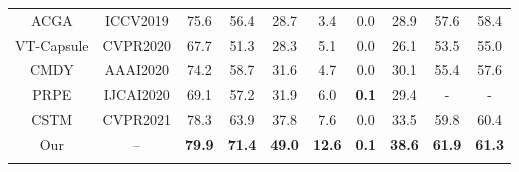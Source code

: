 \documentclass[10pt,twocolumn,letterpaper]{article}
\begin{document}
\begin{table*}[t!]
\begin{tabular}{cccc|cc|ccccc|c|cc|}
		


		
		\multicolumn{4}{|c|}{ACGA \cite{wang2019asymmetric}}                       & \multicolumn{2}{c|}{ICCV2019}                & \multicolumn{1}{|c|}{75.6} & \multicolumn{1}{c|}{56.4}  & \multicolumn{1}{c|}{28.7} & \multicolumn{1}{c|}{3.4} & \multicolumn{1}{c|}{0.0} &  \multicolumn{1}{c|}{28.9} & \multicolumn{1}{c|}{57.6} & \multicolumn{1}{c|}{58.4} \\
		
		
	    \multicolumn{4}{|c|}{VT-Capsule \cite{mcintosh2020visual}}                  & \multicolumn{2}{c|}{CVPR2020}                & \multicolumn{1}{|c|}{67.7} & \multicolumn{1}{c|}{51.3}  & \multicolumn{1}{c|}{28.3} & \multicolumn{1}{c|}{5.1} & \multicolumn{1}{c|}{0.0} & \multicolumn{1}{c|}{26.1}  & \multicolumn{1}{c|}{53.5} & \multicolumn{1}{c|}{55.0}  \\
		
		\multicolumn{4}{|c|}{CMDY \cite{wang2020context}}                        & \multicolumn{2}{c|}{AAAI2020}                & \multicolumn{1}{|c|}{74.2} & \multicolumn{1}{c|}{58.7}  & \multicolumn{1}{c|}{31.6} & \multicolumn{1}{c|}{4.7} & \multicolumn{1}{c|}{0.0}  & \multicolumn{1}{c|}{30.1} & \multicolumn{1}{c|}{55.4} & \multicolumn{1}{c|}{57.6} \\
		
	    \multicolumn{4}{|c|}{PRPE \cite{ning2020polar}}                        & \multicolumn{2}{c|}{IJCAI2020}       & \multicolumn{1}{c|}{69.1}      & \multicolumn{1}{c|}{57.2}      & \multicolumn{1}{c|}{31.9}     & \multicolumn{1}{c|}{6.0}     & \multicolumn{1}{c|}{\textbf{0.1}}    & \multicolumn{1}{c|}{29.4} & \multicolumn{1}{c|}{-} & \multicolumn{1}{c|}{-} \\
		
	
		\multicolumn{4}{|c|}{CSTM \cite{hui2021collaborative}}                    & \multicolumn{2}{c|}{CVPR2021}               & \multicolumn{1}{c|}{78.3}                & \multicolumn{1}{|c|}{63.9} & \multicolumn{1}{c|}{37.8}  & \multicolumn{1}{c|}{7.6} & \multicolumn{1}{c|}{0.0} & \multicolumn{1}{c|}{33.5}
		& \multicolumn{1}{c|}{59.8}  &  \multicolumn{1}{c|}{60.4} \\\hline
		
	    \multicolumn{4}{|c|}{Our }                        & \multicolumn{2}{c|}{--}       & \multicolumn{1}{c|}{\textbf{79.9}}      & \multicolumn{1}{c|}{\textbf{71.4}}      & \multicolumn{1}{c|}{\textbf{49.0}}     & \multicolumn{1}{c|}{\textbf{12.6}}     & \multicolumn{1}{c|}{\textbf{0.1}} & \multicolumn{1}{c|}{\textbf{38.6}} & \multicolumn{1}{c|}{\textbf{61.9}} & \multicolumn{1}{c|}{\textbf{61.3}}  \\ \hline
\vspace{-6mm}
	\end{tabular}
	\label{J-HMDB}
\end{table*}
\end{document}
